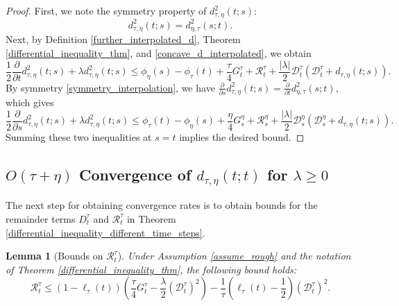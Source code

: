 \documentclass[11pt,a4paper]{amsart}
\newcommand{\1}{\mathds{1}}
\newtheorem{lemma}[theorem]{\textbf{Lemma}}
\numberwithin{equation}{section}
\begin{document}
\begin{proof} 
First, we note the symmetry property of $d^2_{\tau,\eta}(t;s)$:
\begin{equation}  
    d^2_{\tau,\eta}(t;s) = d^2_{\eta,\tau}(s;t).
    \label{symmetry_interpolation} 
\end{equation}  Next, by Definition \ref{further_interpolated_d}, Theorem \ref{differential_inequality_thm}, and \eqref{concave_d_interpolated}, we obtain
\[
\frac{1}{2} \frac{\partial}{\partial t} d^2_{\tau,\eta}(t;s) + \lambda d^2_{\tau,\eta}(t;s)  
\leq  \phi_{\eta}(s) - \phi_{\tau}(t) + \frac{\tau}{4} G^{\tau}_t  + \mathcal{R}^{\tau}_t + \frac{|\lambda|}{2} \mathcal{D}_t^{\tau} \left( \mathcal{D}_t^{\tau} + d_{\tau,\eta}(t;s) \right).
\] By symmetry \eqref{symmetry_interpolation}, we have $\frac{\partial}{\partial s} d^2_{\tau,\eta}(t;s) = \frac{\partial}{\partial t} d^2_{\eta,\tau}(s;t)$, which gives
\[
\frac{1}{2} \frac{\partial}{\partial s} d^2_{\tau,\eta}(t;s) + \lambda d^2_{\tau,\eta}(t;s) 
\leq \phi_{\tau}(t) - \phi_{\eta}(s) + \frac{\eta}{4} G^{\eta}_s + \mathcal{R}^{\eta}_s + \frac{|\lambda|}{2} \mathcal{D}_s^{\eta}\left( \mathcal{D}_s^{\eta} + d_{\tau,\eta}(t;s) \right).
\] Summing these two inequalities at $s=t$ implies the desired bound.
\end{proof}

\subsection{ $O(\tau + \eta)$ Convergence of $d_{\tau,\eta}(t;t)$ for $\lambda \geq 0$}
The next step for obtaining convergence rates is to obtain bounds for the remainder terms $D^{\tau}_t$ and $\mathcal{R}^{\tau}_t$ in Theorem \ref{differential_inequality_different_time_steps}.

\begin{lemma}[Bounds on $\mathcal{R}^{\tau}_t$] \label{R_bounds}
Under Assumption \ref{assume_rough} and the notation of Theorem \ref{differential_inequality_thm}, the following bound holds:
\[
\mathcal{R}_t^{\tau} \leq \left( 1-\ell_{\tau}(t) \right) \left( \frac{\tau}{4} G^{\tau}_t - \frac{\lambda}{2} (\mathcal{D}_t^{\tau})^2 \right) - \frac{1}{\tau}\left( \ell_{\tau}(t) - \frac{1}{2} \right) (\mathcal{D}_t^{\tau})^2.
\]
\end{lemma}
\end{document}
